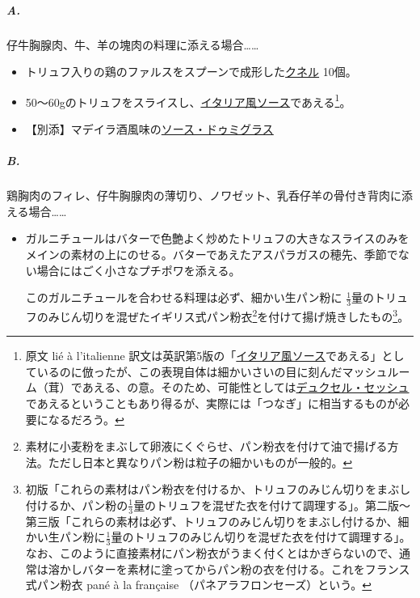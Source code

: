 \begin{recette}


\hypertarget{a.}{%
\subparagraph{A.}\label{a.}}

仔牛胸腺肉、牛、羊の塊肉の料理に添える場合\ldots{}\ldots{}

\begin{itemize}
\item
  トリュフ入りの鶏のファルスをスプーンで成形した\protect\hyperlink{quenelles-diverses}{クネル}
  10個。
\item
  50〜60gのトリュフをスライスし、\protect\hyperlink{sauce-italienne}{イタリア風ソース}であえる\footnote{原文
    lié à l'italienne
    訳文は英訳第5版の「\protect\hyperlink{sauce-italienne}{イタリア風ソース}であえる」としているのに倣ったが、この表現自体は細かいさいの目に刻んだマッシュルーム（茸）であえる、の意。そのため、可能性としては\protect\hyperlink{duxelles-seche}{デュクセル・セッシュ}であえるということもあり得るが、実際には「つなぎ」に相当するものが必要になるだろう。}。
\item
  【別添】マデイラ酒風味の\protect\hyperlink{sauce-demi-glace}{ソース・ドゥミグラス}
\end{itemize}

\hypertarget{b.}{%
\subparagraph{B.}\label{b.}}

鶏胸肉のフィレ、仔牛胸腺肉の薄切り、ノワゼット、乳呑仔羊の骨付き背肉に添える場合\ldots{}\ldots{}

\begin{itemize}
\item
  ガルニチュールはバターで色艶よく炒めたトリュフの大きなスライスのみをメインの素材の上にのせる。バターであえたアスパラガスの穂先、季節でない場合にはごく小さなプチポワを添える。

  このガルニチュールを合わせる料理は必ず、細かい生パン粉に
  \(\frac{1}{3}\)量のトリュフのみじん切りを混ぜたイギリス式パン粉衣\footnote{素材に小麦粉をまぶして卵液にくぐらせ、パン粉衣を付けて油で揚げる方法。ただし日本と異なりパン粉は粒子の細かいものが一般的。}を付けて揚げ焼きしたもの\footnote{初版「これらの素材はパン粉衣を付けるか、トリュフのみじん切りをまぶし付けるか、パン粉の\(\frac{1}{3}\)量のトリュフを混ぜた衣を付けて調理する」。第二版〜第三版「これらの素材は必ず、トリュフのみじん切りをまぶし付けるか、細かい生パン粉に\(\frac{1}{3}\)量のトリュフのみじん切りを混ぜた衣を付けて調理する」。なお、このように直接素材にパン粉衣がうまく付くとはかぎらないので、通常は溶かしバターを素材に塗ってからパン粉の衣を付ける。これをフランス式パン粉衣
    pané à la française （パネアラフロンセーズ）という。}。
\end{itemize}


\end{recette}
